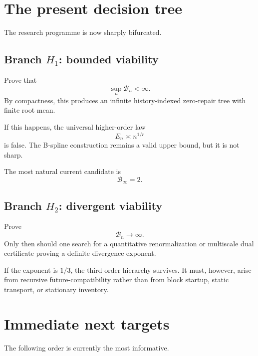 \documentclass[11pt,a4paper]{article}
\newcommand{\cB}{\mathcal B}
\begin{document}
\section{The present decision tree}

The research programme is now sharply bifurcated.

\subsection*{Branch \(H_1\): bounded viability}

Prove that
\[
\sup_n\cB_n<\infty.
\]
By compactness, this produces an infinite history-indexed zero-repair tree
with finite root mean.

If this happens, the universal higher-order law
\[
E_n\asymp n^{1/r}
\]
is false.  The B-spline construction remains a valid upper bound, but it is
not sharp.

The most natural current candidate is
\[
\boxed{
\cB_\infty=2.
}
\]

\subsection*{Branch \(H_2\): divergent viability}

Prove
\[
\cB_n\to\infty.
\]
Only then should one search for a quantitative renormalization or multiscale
dual certificate proving a definite divergence exponent.

If the exponent is \(1/3\), the third-order hierarchy survives.  It must,
however, arise from recursive future-compatibility rather than from block
startup, static transport, or stationary inventory.

\section{Immediate next targets}

The following order is currently the most informative.
\end{document}

